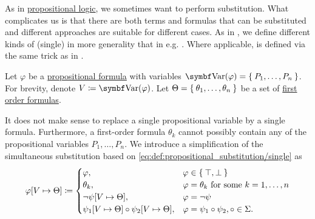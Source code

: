 \begin{definition}\label{def:first_order_substitution}
  As in \hyperref[subsec:language_of_propositional_logic]{propositional logic}, we sometimes want to perform substitution. What complicates us is that there are both terms and formulas that can be substituted and different approaches are suitable for different cases. As in , we define different kinds of (single)  in more generality that in e.g. \cite[def. 14.25]{OpenLogic20201202}. Where applicable,  is defined via the same trick as in .

  \begin{DefEnum}
     Let \( \varphi \) be a \hyperref[def:propositional_syntax/formula]{propositional formula} with variables \( \Bold{Var}(\varphi) = \Set{ P_1, \ldots, P_n } \). For brevity, denote \( V \coloneqq \Bold{Var}(\varphi) \). Let \( \Theta = \Set{ \theta_1, \ldots, \theta_n } \) be a set of \hyperref[def:first_order_syntax/formula]{first order formulas}.

    It does not make sense to replace a single propositional variable by a single formula. Furthermore, a first-order formula \( \theta_k \) cannot possibly contain any of the propositional variables \( P_1, \ldots, P_n \). We introduce a simplification of the simultaneous substitution based on \eqref{eq:def:propositional_substitution/single} as
    \begin{equation}\label{eq:def:first_order_substitution/predicate}
      \varphi[V \mapsto \Theta] \coloneqq \begin{cases}
        \varphi,                                             &\varphi \in \Set{ \top, \bot } \\
        \theta_k,                                            &\varphi = \theta_k \text{ for some } k = 1, \ldots, n \\
        \neg \psi[V \mapsto \Theta],                           &\varphi = \neg \psi \\
        \psi_1[V \mapsto \Theta] \circ \psi_2[V \mapsto \Theta], &\varphi = \psi_1 \circ \psi_2, \circ \in \Sigma.
      \end{cases}
    \end{equation}


\end{DefEnum}
\end{definition}
